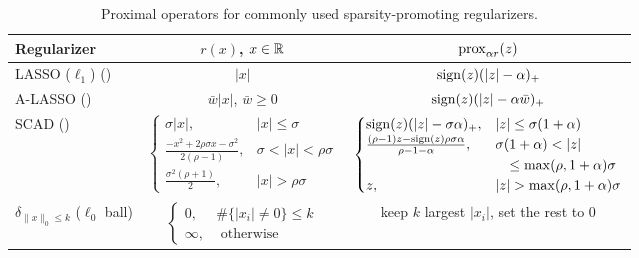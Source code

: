 \begin{table}[H]
\small
    \centering
    \begin{tabular}{|p{25.4mm}|c|c|}
        \hline
         \!\!Regularizer & $r(x)$, $x \in \operatorname{\mathbb{R}}$ & ${\mathrm{prox}}_{\alpha r}(z)  $ \\
         \hline \hline
         LASSO ($\ell_1$) \newline (\cite{tibshirani1996regression}) & $|x|$ & $\operatorname*{\mathrm{sign}}(z)(|z| - \alpha)_+$ \\
         \hline
         A-LASSO \newline (\cite{Fan2001}) & $\bar{w}|x|$, $\bar{w} \geq 0$ &  $\operatorname*{\mathrm{sign}}(z)(|z| - \alpha\bar{w})_+$\\
         \hline
         SCAD \newline (\cite{fan1997comments}) & $\begin{cases} \sigma |x|, & |x| \leq \sigma \\ \frac{-x^2 + 2\rho\sigma x - \sigma^2}{2(\rho - 1)}, & \sigma < |x| < \rho\sigma \\ \frac{\sigma^2(\rho + 1)}{2}, & |x| > \rho\sigma \end{cases}$ & $\begin{cases} \operatorname*{\mathrm{sign}}(z)(|z| - \sigma\alpha)_+, & |z| \leq \sigma(1+\alpha) \\ \frac{(\rho - 1)z - \operatorname*{\mathrm{sign}}(z)\rho \sigma\alpha}{\rho - 1 - \alpha}, & \sigma(1+\alpha) < |z| \\
         &\quad\leq \max(\rho, 1+\alpha)\sigma \\ z, & |z| > \max(\rho,1+\alpha)\sigma \end{cases}$ \\
         \hline
         $\delta_{\|x\|_0 \leq k}$  \newline ($\ell_0$ ball) & $\begin{cases} 0, & \#\{|x_i| \neq 0\} \leq k\\ \infty, & \text{ otherwise}\end{cases}$ & keep $k$ largest $|x_i|$, set the rest to 0 \\
         \hline
    \end{tabular}
    \caption{Proximal operators for commonly used sparsity-promoting regularizers. }
    \label{table:proxes}
\end{table}


